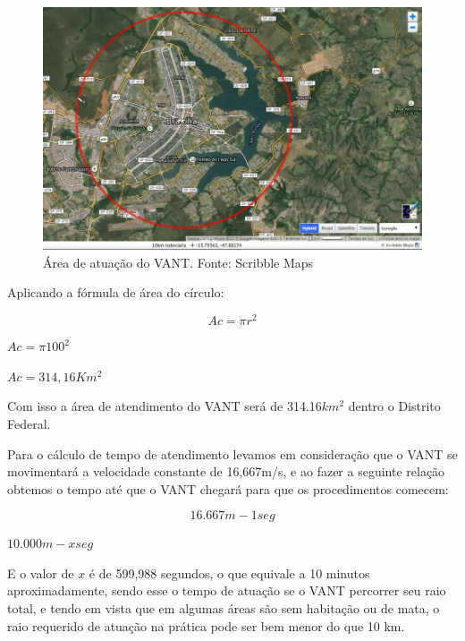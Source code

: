 \begin{figure}[H]
    \centering
	\includegraphics[keepaspectratio=true,scale=0.6]{figuras/area.jpg}
    \caption{Área de atuação do VANT. Fonte: Scribble Maps\protect\footnotemark}
    \label{fig:area}
\end{figure}


Aplicando a fórmula de área do círculo:

\begin{equation}
 Ac = \pi r^2
\end{equation}

\begin{center}
  $Ac = \pi 100^2$
  
  $Ac = 314,16 Km^2$
\end{center}

Com isso a área de atendimento do VANT será de 314.16$km^2$ dentro o Distrito Federal.

Para o cálculo de tempo de atendimento levamos em consideração que o VANT se movimentará 
a velocidade constante de 16,667m/s, e ao fazer a seguinte relação obtemos o tempo até 
que o VANT chegará para que os procedimentos comecem:

\begin{equation}
 16.667m - 1seg
\end{equation}

\begin{center}
 $10.000m - xseg$
\end{center}

E o valor de $x$ é de 599,988 segundos, o que equivale a 10 minutos aproximadamente, 
sendo esse o tempo de atuação se o VANT percorrer seu raio total, e tendo em vista 
que em algumas áreas são sem habitação ou de mata, o raio requerido de atuação na 
prática pode ser bem menor do que 10 km. 


